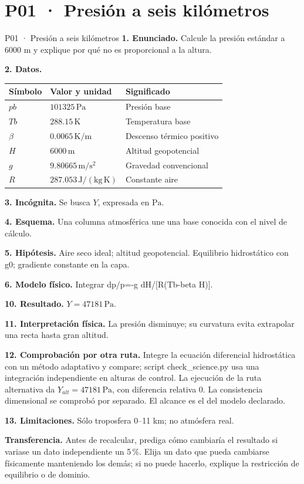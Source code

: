 \chapter*{P01 · Presión a seis kilómetros}
\begin{studiumworked}{P01 · Presión a seis kilómetros}
\textbf{1. Enunciado.} Calcule la presión estándar a 6000 m y explique por qué no es proporcional a la altura.

\textbf{2. Datos.}
\begin{longtable}{p{.16\linewidth}p{.35\linewidth}p{.38\linewidth}}\toprule Símbolo & Valor y unidad & Significado\\\midrule\endhead
$pb$ & $101325\,\mathrm{Pa}$ & Presión base\\
$Tb$ & $288.15\,\mathrm K$ & Temperatura base\\
$\beta$ & $0.0065\,\mathrm{K/m}$ & Descenso térmico positivo\\
$H$ & $6000\,\mathrm m$ & Altitud geopotencial\\
$g$ & $9.80665\,\mathrm{m/s^2}$ & Gravedad convencional\\
$R$ & $287.053\,\mathrm{J/(kg\,K)}$ & Constante aire\\
\bottomrule\end{longtable}
\textbf{3. Incógnita.} Se busca $Y$, expresada en $\mathrm{Pa}$.

\textbf{4. Esquema.} Una columna atmosférica une una base conocida con el nivel de cálculo.

\textbf{5. Hipótesis.} Aire seco ideal; altitud geopotencial. Equilibrio hidrostático con g0; gradiente constante en la capa.

\textbf{6. Modelo físico.} Integrar dp/p=-g dH/[R(Tb-beta H)].


\textbf{10. Resultado.} $Y=47181\,\mathrm{Pa}$.

\textbf{11. Interpretación física.} La presión disminuye; su curvatura evita extrapolar una recta hasta gran altitud.

\textbf{12. Comprobación por otra ruta.} Integre la ecuación diferencial hidrostática con un método adaptativo y compare; script check\_science.py usa una integración independiente en alturas de control. La ejecución de la ruta alternativa da $Y_{alt}=47181\,\mathrm{Pa}$, con diferencia relativa $0$. La consistencia dimensional se comprobó por separado. El alcance es el del modelo declarado.

\textbf{13. Limitaciones.} Sólo troposfera 0–11 km; no atmósfera real.

\textbf{Transferencia.} Antes de recalcular, prediga cómo cambiaría el resultado si variase un dato independiente un 5\,\%. Elija un dato que pueda cambiarse físicamente manteniendo los demás; si no puede hacerlo, explique la restricción de equilibrio o de dominio.\par
\end{studiumworked}
